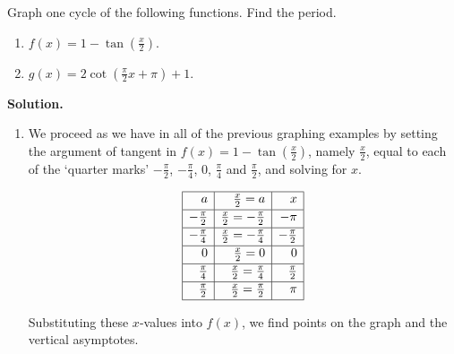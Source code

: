 \pagebreak

\begin{ex} \label{tancotgraphex} Graph one cycle of the following functions.  Find the period.

\begin{multicols}{2}

\begin{enumerate}

\item  $f(x) = 1 - \tan\left(\frac{x}{2}\right)$.

\item  $g(x) = 2\cot\left(\frac{\pi}{2} x + \pi\right) + 1$.

\end{enumerate}

\end{multicols}


{\bf Solution.}  

\begin{enumerate}

\item We proceed as we have in all of the previous graphing examples by setting the argument of tangent in $f(x) = 1 - \tan\left(\frac{x}{2}\right)$, namely $\frac{x}{2}$, equal to each of the `quarter marks' $-\frac{\pi}{2}$, $-\frac{\pi}{4}$, $0$, $\frac{\pi}{4}$ and $\frac{\pi}{2}$, and solving for $x$.

\setlength{\extrarowheight}{2pt}
\[ \begin{array}{|r|r|r|}  

\hline

 a & \frac{x}{2} = a & x \\ [2pt] \hline
-\frac{\pi}{2}  & \frac{x}{2} = -\frac{\pi}{2} & -\pi \\ [2pt]   \hline

-\frac{\pi}{4}  &\frac{x}{2} = -\frac{\pi}{4} & - \frac{\pi}{2} \\ [2pt] \hline 

0 &  \frac{x}{2} = 0 & 0 \\ [2pt] \hline 

\frac{\pi}{4}  &  \frac{x}{2} = \frac{\pi}{4} & \frac{\pi}{2} \\ [2pt] \hline 

\frac{\pi}{2}  & \frac{x}{2} = \frac{\pi}{2}  & \pi \\  [2pt] \hline
\end{array} \]
\setlength{\extrarowheight}{0pt}

Substituting these $x$-values into $f(x)$, we find points on the graph and the vertical asymptotes.


\end{enumerate}
\end{ex}
